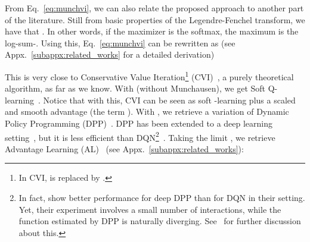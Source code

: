 \documentclass{article}
\begin{document}
From Eq.~\eqref{eq:munchvi}, we can also relate the proposed approach to another part of the literature. Still from basic properties of the Legendre-Fenchel transform, we have that . In other words, if the maximizer is the softmax, the maximum is the log-sum-. Using this, Eq.~\eqref{eq:munchvi} can be rewritten as (see Appx.~\ref{subappx:related_works} for a detailed derivation)

This is very close to Conservative Value Iteration\footnote{In CVI,  is replaced by .} (CVI)~\cite{kozuno2019theoretical}, a purely theoretical algorithm, as far as we know. With  (without Munchausen), we get Soft Q-learning~\cite{fox2015taming,haarnoja2017reinforcement}. Notice that with this, CVI can be seen as soft -learning plus a scaled and smooth advantage (the term ). With , we retrieve a variation of Dynamic Policy Programming (DPP)~\cite[Appx.~A]{azar2012dynamic}.
DPP has been extended to a deep learning setting~\cite{tsurumine2017deep}, but it is less efficient than DQN\footnote{
In fact, \citet{tsurumine2017deep} show better performance for deep DPP than for DQN in their setting. Yet, their experiment involves a small number of interactions, while the function estimated by DPP is naturally diverging. See~\cite[Sec.~6]{vieillard2019momentum} for further discussion about this.
}~\cite{vieillard2020leverage}.
Taking the limit , we retrieve Advantage Learning (AL)~\cite{baird1999reinforcement,bellemare2016increasing} (see Appx.~\ref{subappx:related_works}):
\end{document}
